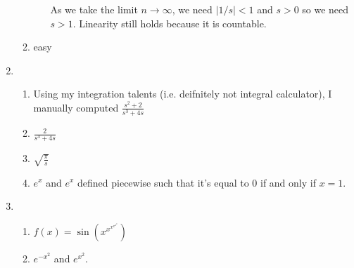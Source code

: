 \documentclass{article}
\begin{document}
\begin{enumerate}
\begin{enumerate}
\begin{enumerate}
            As we take the limit $n\to \infty$, we need $|1/s|<1$ and $s>0$ so we need $s>1.$ Linearity still holds because it is countable.
        \end{enumerate}
        \item easy
    \end{enumerate}
    \item \begin{enumerate}
        \item Using my integration talents (i.e. deifnitely not integral calculator), I manually computed  $\frac{s^2+2}{s^3+4s}$
        \item $\frac{2}{s^3+4s}$
        \item $\sqrt{\frac{\pi}{s}}$
        \item $e^x$ and $e^x$ defined piecewise such that it's equal to $0$ if and only if $x=1$.
    \end{enumerate}
    \item \begin{enumerate}
        \item $f(x)=\sin(x^{x^{x^{x^{x^x}}}})$
        \item $e^{-x^2}$ and $e^{x^2}.$
    \end{enumerate}
    
\end{enumerate}
\end{document}
